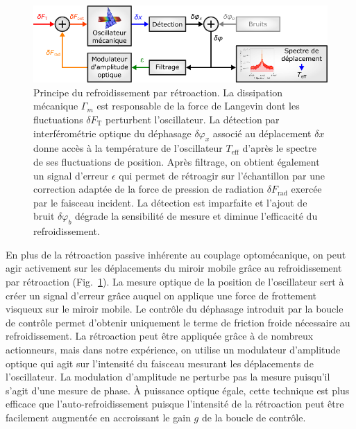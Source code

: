 \documentclass[12pt,a4paper]{article}
\begin{document}
\begin{figure}
\center
\includegraphics[scale=0.6]{figures/feedback_cooling_v2.png}
\caption{Principe du refroidissement par rétroaction.
La dissipation mécanique $\Gamma_m$ est responsable de la force de Langevin dont les fluctuations $\delta F_\mathrm{T}$ perturbent l'oscillateur.
La détection par interférométrie optique du déphasage $\delta \varphi_x$ associé au déplacement $\delta x$ donne accès à la température de l'oscillateur $T_\mathrm{eff}$ d'après le spectre de ses fluctuations de position.
Après filtrage, on obtient également un signal d'erreur $\epsilon$ qui permet de rétroagir sur l'échantillon par une correction adaptée de la force de pression de radiation $\delta F_\mathrm{rad}$ exercée par le faisceau incident.
La détection est imparfaite et l'ajout de bruit $\delta \varphi_b$ dégrade la sensibilité de mesure et diminue l'efficacité du refroidissement.}
\label{fig:feedback_scheme}
\end{figure}

En plus de la rétroaction passive inhérente au couplage optomécanique, on peut agir activement sur les déplacements du miroir mobile grâce au refroidissement par rétroaction (Fig.~\ref{fig:feedback_scheme}).
La mesure optique de la position de l'oscillateur sert à créer un signal d'erreur grâce auquel on applique une force de frottement visqueux sur le miroir mobile.
Le contrôle du déphasage introduit par la boucle de contrôle permet d'obtenir uniquement le terme de friction froide nécessaire au refroidissement.
La rétroaction peut être appliquée grâce à de nombreux actionneurs, mais dans notre expérience, on utilise un modulateur d'amplitude optique qui agit sur l'intensité du faisceau mesurant les déplacements de l'oscillateur.
La modulation d'amplitude ne perturbe pas la mesure puisqu'il s'agit d'une mesure de phase. 
À puissance optique égale, cette technique est plus efficace que l'auto-refroidissement puisque l'intensité de la rétroaction peut être facilement augmentée en accroissant le gain $g$ de la boucle de contrôle.
\end{document}
